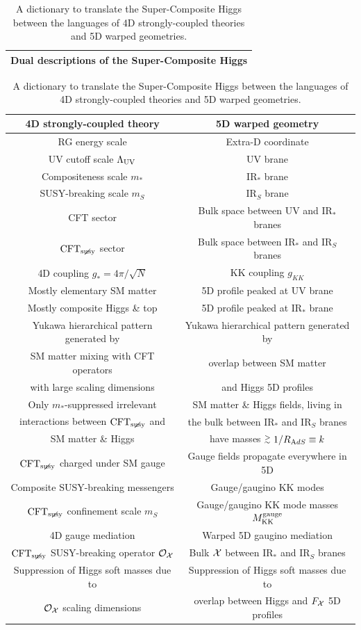\documentclass[a4paper,12pt]{article}
\newcommand{\gsim}{\stackrel{>}{_\sim}}
\def\LUV{\Lambda_{\rm UV}}
\def\mst{m_*}
\def\mS{m_S}
\def\CFTs{{\rm CFT}_ {{\rm susy}\! \! \! \! \! \! \! \!\diagup \,\,\,}}
\begin{document}
\renewcommand{\arraystretch}{1.2}
\begin{table}[t!]
\centering
\begin{tabular}{|c|}
\hline
{\bf Dual descriptions of the Super-Composite Higgs}\\
\hline
\end{tabular}
\begin{tabular}{|c|c|}
\hline
{\bf 4D strongly-coupled theory} & {\bf 5D warped geometry} \\
\hline
\hline
RG energy scale & Extra-D coordinate \\ \hline
UV cutoff scale $\LUV$ & UV brane \\ \hline
Compositeness scale $\mst$ & IR$_*$ brane \\ \hline
SUSY-breaking scale $\mS$ & IR$_S$ brane \\ \hline
CFT sector & Bulk space between UV and IR$_*$ branes \\ \hline
$\CFTs$ sector & Bulk space between IR$_*$ and IR$_S$ branes \\ \hline
4D coupling $g_*={4\pi}/{\sqrt N}$ & KK coupling $g_{KK}$ \\ \hline
Mostly elementary SM matter & 5D profile peaked at UV brane \\ \hline
Mostly composite Higgs \& top & 5D profile peaked at IR$_*$ brane \\ \hline
Yukawa hierarchical pattern generated by & Yukawa hierarchical pattern generated by \\[-1.5mm] 
SM matter mixing with CFT operators 
& overlap between SM matter  \\[-1.5mm] 
with large scaling dimensions & and Higgs 5D profiles \\ \hline
Only $\mst$-suppressed irrelevant & 
SM matter \& Higgs fields, living in\\[-1.5mm]  
interactions between $\CFTs$ and & 
the bulk between IR$_*$ and IR$_S$ branes \\[-1.5mm]
SM matter \& Higgs & 
have masses $\gsim 1/R_{\text AdS} \equiv k$
\\ \hline
$\CFTs$ charged under SM gauge & Gauge fields propagate everywhere in 5D \\ \hline
Composite SUSY-breaking messengers & Gauge/gaugino KK modes \\ \hline
$\CFTs$ confinement scale $\mS$ & Gauge/gaugino KK mode masses $M^{ \rm gauge }_{ \rm KK }$ \\ \hline
4D gauge mediation & Warped 5D gaugino mediation \\ \hline
$\CFTs$ SUSY-breaking operator ${\cal O}_{\cal X}$ & Bulk ${\cal X}$ between IR$_*$ and IR$_S$ branes \\ \hline
Suppression of Higgs soft masses due to & Suppression of Higgs soft masses due to \\[-1.5mm]
${\cal O}_{\cal X}$ scaling dimensions & overlap between Higgs and $F_{\cal X}$ 5D profiles \\ \hline
\end{tabular}
\renewcommand{\arraystretch}{1}
\caption{A dictionary to translate the Super-Composite Higgs between the languages of 4D strongly-coupled theories and 5D warped geometries.}
\label{tab:dual}
\end{table}
\end{document}
